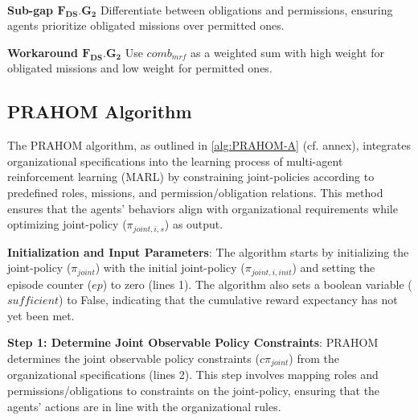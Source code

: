 \documentclass[conference]{IEEEtran}
\newcounter{relation}
\begin{document}
\

\textbf{Sub-gap $\mathbf{F_{DS}.G_2}$} \quad Differentiate between obligations and permissions, ensuring agents prioritize obligated missions over permitted ones.

\textbf{Workaround $\mathbf{F_{DS}.G_2}$} \quad Use $comb_{mrf}$ as a weighted sum with high weight for obligated missions and low weight for permitted ones.


\subsection{PRAHOM Algorithm}\label{sec:prahom_alg}



The PRAHOM algorithm, as outlined in \autoref{alg:PRAHOM-A} (cf. annex), integrates organizational specifications into the learning process of multi-agent reinforcement learning (MARL) by constraining joint-policies according to predefined roles, missions, and permission/obligation relations. This method ensures that the agents' behaviors align with organizational requirements while optimizing joint-policy ($\pi_{joint,i,s}$) as output.

\textbf{Initialization and Input Parameters}: \quad
The algorithm starts by initializing the joint-policy ($\pi_{joint}$) with the initial joint-policy ($\pi_{joint,i,init}$) and setting the episode counter ($ep$) to zero (lines 1). The algorithm also sets a boolean variable ($sufficient$) to False, indicating that the cumulative reward expectancy has not yet been met.

\textbf{Step 1: Determine Joint Observable Policy Constraints}: \quad
PRAHOM determines the joint observable policy constraints ($c\pi_{joint}$) from the organizational specifications (lines 2). This step involves mapping roles and permissions/obligations to constraints on the joint-policy, ensuring that the agents' actions are in line with the organizational rules.
\end{document}
